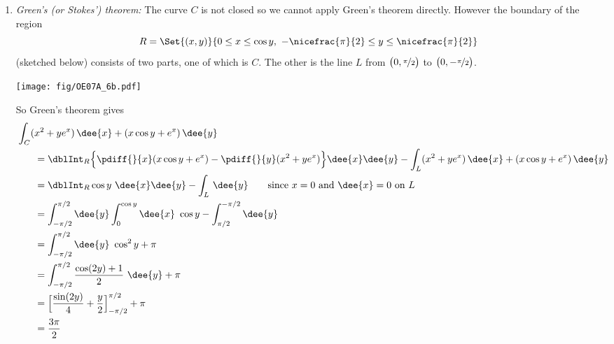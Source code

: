 \begin{solution}
\begin{enumerate}[(1)]
\item \emph{Green's (or Stokes') theorem:}
The curve $C$ is not closed so we cannot apply Green's theorem directly.
However the boundary of the region
\begin{equation*}
R = \Set{(x,y)}{ 0\le x\le\cos y,\
           -\nicefrac{\pi}{2}\le y\le \nicefrac{\pi}{2} }
\end{equation*}
(sketched below) consists of two parts, one of which is $C$. The other
is the line $L$ from $\big(0,\nicefrac{\pi}{2}\big)$
to $\big(0,-\nicefrac{\pi}{2}\big)$.

     \begin{center}
          \texttt{[image: fig/OE07A\_6b.pdf]}
     \end{center}

So Green's theorem gives
\begin{align*}
&\int_C (x^2 + y e^x ) \,\dee{x} + (x \cos y + e^x ) \,\dee{y} \\
&\hskip0.25in=\dblInt_R \Big\{\pdiff{}{x}(x \cos y + e^x )
          -\pdiff{}{y}(x^2 + y e^x )\Big\}\dee{x}\dee{y}
-\int_L (x^2 + y e^x ) \,\dee{x} + (x \cos y + e^x ) \,\dee{y} \\
&\hskip0.25in=\dblInt_R \cos y\ \dee{x}\dee{y}  -  \int_L \,\dee{y}\qquad
    \text{since $x=0$ and $\dee{x}=0$ on $L$} \\
&\hskip0.25in=\int_{-\pi/2}^{\pi/2}\dee{y}\int_0^{\cos y}\dee{x}\ \cos y
                       -\int_{\pi/2}^{-\pi/2}\dee{y} \\
&\hskip0.25in=\int_{-\pi/2}^{\pi/2}\dee{y}\ \cos^2 y
                       + \pi \\
&\hskip0.25in
  =\int_{-\pi/2}^{\pi/2} \frac{\cos(2y)+1}{2}\ \dee{y} + \pi \\
&\hskip0.25in
  =\Big[ \frac{\sin(2y)}{4} +\frac{y}{2}\Big]_{-\pi/2}^{\pi/2} +\pi \\
&\hskip0.25in
  =\frac{3\pi}{2}
\end{align*}



\end{enumerate}
\end{solution}
